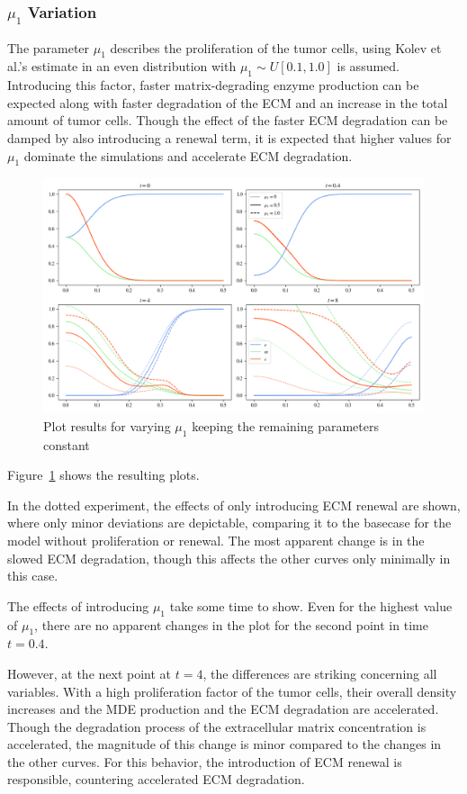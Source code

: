 \subsubsection*{$\mu_1$ Variation}
The parameter $\mu_1$ describes the proliferation of the tumor cells, using Kolev et al.'s estimate in \cite{Kolev2010} an even distribution with $\mu_1 \sim U[0.1, 1.0]$ is assumed. Introducing this factor, faster matrix-degrading enzyme production can be expected along with faster degradation of the ECM and an increase in the total amount of tumor cells. Though the effect of the faster ECM degradation can be damped by also introducing a renewal term, it is expected that higher values for $\mu_1$ dominate the simulations and accelerate ECM degradation.
\begin{figure}[h!]
 \centering
 \includegraphics[width=\textwidth]{resources/images/prolif_mu_1_variation.png}
 \caption{Plot results for varying $\mu_1$ keeping the remaining parameters constant}
 \label{fig:prolif_mu_1_variation}
\end{figure}
Figure~\ref{fig:prolif_mu_1_variation} shows the resulting plots.

In the dotted experiment, the effects of only introducing ECM renewal are shown, where only minor deviations are depictable, comparing it to the basecase for the model without proliferation or renewal. The most apparent change is in the slowed ECM degradation, though this affects the other curves only minimally in this case.

The effects of introducing $\mu_1$ take some time to show. Even for the highest value of $\mu_1$, there are no apparent changes in the plot for the second point in time $t=0.4$.

However, at the next point at $t=4$, the differences are striking concerning all variables. With a high proliferation factor of the tumor cells, their overall density increases and the MDE production and the ECM degradation are accelerated. Though the degradation process of the extracellular matrix concentration is accelerated, the magnitude of this change is minor compared to the changes in the other curves. For this behavior, the introduction of ECM renewal is responsible, countering accelerated ECM degradation.

